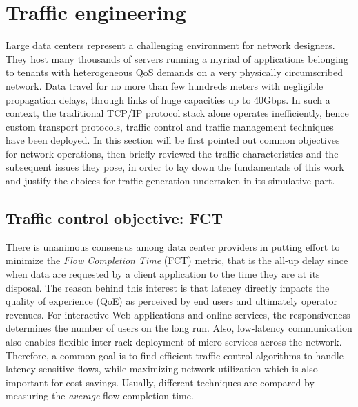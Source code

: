 \section{Traffic engineering}

Large data centers represent a challenging environment for network designers. They host many thousands of servers running a myriad of applications belonging to tenants with heterogeneous QoS demands on a very physically circumscribed network. Data travel for no more than few hundreds meters with negligible propagation delays, through links of huge capacities up to 40Gbps. In such a context, the traditional TCP/IP protocol stack alone operates inefficiently, hence custom transport protocols, traffic control and traffic management techniques have been deployed. In this section will be first pointed out common objectives for network operations, then briefly reviewed the traffic characteristics and the subsequent issues they pose, in order to lay down the fundamentals of this work and justify the choices for traffic generation undertaken in its simulative part.

\subsection{Traffic control objective: FCT}
There is unanimous consensus among data center providers in putting effort to minimize the \textit{Flow Completion Time} (FCT) metric, that is the all-up delay since when data are requested by a client application to the time they are at its disposal. The reason behind this interest is that latency directly impacts the quality of experience (QoE) as perceived by end users and ultimately operator revenues.  For interactive Web applications and online services, the responsiveness determines the number of users on the long run. Also, low-latency communication also enables flexible inter-rack deployment of micro-services across the network. Therefore, a common goal is to find efficient traffic control algorithms to handle latency sensitive flows, while maximizing network utilization which is also important for cost savings. Usually, different techniques are compared by measuring the \emph{average} flow completion time.\\

